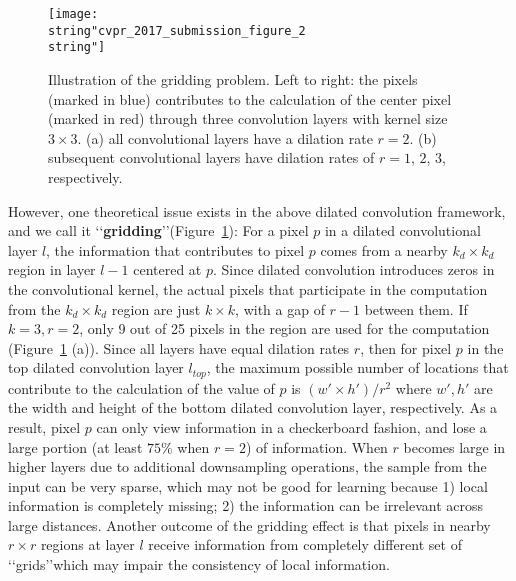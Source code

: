 \documentclass[10pt,twocolumn,letterpaper]{article}
\begin{document}
\begin{figure}[tp]
\begin{center}
\texttt{[image: \\string"cvpr\_2017\_submission\_figure\_2\\string"]}
\end{center}
\caption{Illustration of the gridding problem. Left to right: the pixels (marked in blue) contributes to the calculation of the center pixel (marked in red) through three convolution layers with kernel size $3\times 3$. (a) all convolutional layers have a dilation rate $r=2$. (b) subsequent convolutional layers have dilation rates of $r=1$, $2$, $3$, respectively.}
\vspace{-15pt}
\label{Figure2_gridding}
\end{figure}

However, one theoretical issue exists in the above dilated convolution framework, and we call it \lq\lq \textbf{gridding}\rq\rq (Figure~\ref{Figure2_gridding}):  For a pixel $p$ in a dilated convolutional layer $l$, the information that contributes to pixel $p$ comes from a nearby $k_d\times k_d$ region in layer $l-1$ centered at $p$. Since dilated convolution introduces zeros in the convolutional kernel, the actual pixels that participate in the computation from the $k_d\times k_d$ region are just $k\times k$, with a gap of $r-1$ between them. If $k=3, r=2$, only 9 out of 25 pixels in the region are used for the computation (Figure~\ref{Figure2_gridding} (a)). Since all layers have equal dilation rates $r$, then for pixel $p$ in the top dilated convolution layer $l_{top}$, the maximum possible number of locations that contribute to the calculation of the value of $p$ is $(w'\times h')/r^2$ where $w', h'$ are the width and height of the bottom dilated convolution layer, respectively. As a result, pixel $p$ can only view information in a checkerboard fashion, and lose a large portion (at least $75\%$ when $r=2$) of information. When $r$ becomes large in higher layers due to additional downsampling operations, the sample from the input can be very sparse, which may not be good for learning because 1) local information is completely missing; 2) the information can be irrelevant across large distances. Another outcome of the gridding effect is that pixels in nearby $r\times r$ regions at layer $l$ receive information from completely different set of \lq\lq grids\rq\rq which may impair the consistency of local information.
\end{document}
